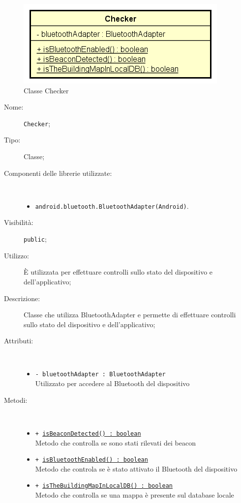 \documentclass[../DefinizioneDiProdotto.tex]{subfiles}
\begin{document}
    \begin{figure}[H]
        \centering
        \includegraphics{img/Checker.png}
        \caption{Classe Checker}\label{fig:presenter::Checker} 
    \end{figure}
    \begin{description}
\item[Nome:] \texttt{Checker};
\item[Tipo:] Classe;
\item[Componenti delle librerie utilizzate:] \
\begin{itemize}
\item \texttt{android.bluetooth.BluetoothAdapter(Android)}.

\end{itemize}
\item[Visibilità:] \texttt{public};
\item[Utilizzo:] È utilizzata per effettuare controlli sullo stato del dispositivo e dell'applicativo;
\item[Descrizione:] Classe che utilizza BluetoothAdapter e permette di effettuare controlli sullo stato del dispositivo e dell'applicativo;
\item[Attributi:] \
\begin{itemize}
\item \texttt{- bluetoothAdapter : BluetoothAdapter}\\
Utilizzato per accedere al Bluetooth del dispositivo

\end{itemize}
\item[Metodi:] \
\begin{itemize}
\item \texttt{+ \underline{isBeaconDetected() : boolean}}\\
Metodo che controlla se sono stati rilevati dei beacon
 \item \texttt{+ \underline{isBluetoothEnabled() : boolean}}\\
Metodo che controla se è stato attivato il Bluetooth del dispositivo
 \item \texttt{+ \underline{isTheBuildingMapInLocalDB() : boolean}}\\
Metodo che controlla se una mappa è presente sul database locale
 \end{itemize}
\end{description}
\end{document}
